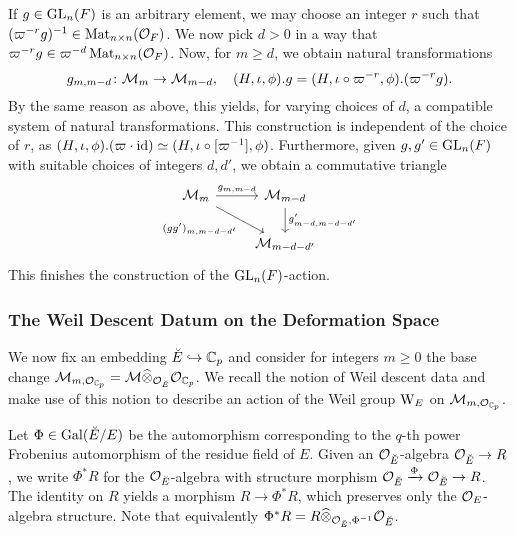 \documentclass[../main.tex]{subfiles}
\begin{document}
If $g \in \operatorname{GL}_n(F)$ is an arbitrary element, we may choose an integer $r$ such
that $(\varpi^{-r} g)^{-1} \in \operatorname{Mat}_{n \times n}(\mathcal{O}_F)$. We now pick 
$d > 0$ in a way that $\varpi^{-r}g \in \varpi^{-d}\operatorname{Mat}_{n \times n}(\mathcal{O}_F)$. 
Now, for $m \geq d$, we obtain natural transformations
\begin{equation*}
  g_{m,m-d}\colon \mathcal{M}_{m} \to \mathcal{M}_{m-d}, \quad (H, \iota, \phi).g = (H, \iota \circ \varpi^{-r}, \phi).(\varpi^{-r}g).
\end{equation*}
By the same reason as above, this yields, for varying choices of $d$, a
compatible system of natural transformations.
This construction is independent of the choice of $r$, as $(H, \iota,
\phi).(\varpi\cdot\operatorname{id}) \simeq (H, \iota \circ [\varpi^{-1}], \phi)$.
Furthermore, given $g, g' \in \operatorname{GL}_n(F)$ with suitable choices of integers 
$d, d'$, we obtain a commutative triangle
\begin{equation*}
\begin{tikzcd}[ampersand replacement=\&]
	{\cM_{m}} \& {\cM_{m-d}} \\
	\& {\cM_{m-d-d'}}
	\arrow["{g_{m,m-d}}", from=1-1, to=1-2]
	\arrow["{(gg')_{m,m-d-d'}}"', from=1-1, to=2-2]
	\arrow["{g'_{m-d,m-d-d'}}", from=1-2, to=2-2]
\end{tikzcd}
\end{equation*}
This finishes the construction of the $\operatorname{GL}_n(F)$-action.


\subsubsection{The Weil Descent Datum on the Deformation Space} %
\label{ssub:The Weil Descent Datum}
We now fix an embedding ${\breve {E}} \hookrightarrow \mathbb{C}_p$ and consider for integers $m \geq 0$ the
base change $\mathcal{M}_{m, \mathcal{O}_{\mathbb{C}_p}} = \mathcal{M} \widehat \otimes_{\mathcal{O}_{\breve {E}}} \mathcal{O}_{\mathbb{C}_p}$. 
We recall the notion of Weil descent data and make use of this notion to describe
an action of the Weil group $\mathrm W_E$ on $\mathcal{M}_{m, \mathcal{O}_{\mathbb{C}_p}}$.

Let $\Phi \in \operatorname{Gal}({\breve {E}} / E)$ be the automorphism corresponding to the
$q$-th power Frobenius automorphism of the residue field of $E$. Given
an $\mathcal{O}_{\breve {E}}$-algebra $\mathcal{O}_{\breve {E}} \to R$, we write $\Phi^*R$ for the 
$\mathcal{O}_{\breve {E}}$-algebra with structure morphism $\mathcal{O}_{\breve {E}} \xrightarrow{\Phi} \mathcal{O}_{\breve {E}} \to R$.
The identity on $R$ yields a morphism $R \to \Phi^* R$, which preserves only the 
$\mathcal{O}_E$-algebra structure. Note that equivalently $\Phi^* R = R
\widehat \otimes_{\mathcal{O}_{\breve {E}}, \Phi^{-1}} \mathcal{O}_{\breve {E}}$.
\end{document}
